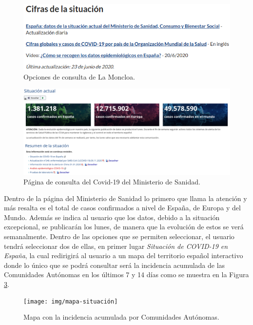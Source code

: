 \begin{figure}[H]
	\centering
	\includegraphics[width=1\textwidth]{img/opciones-moncloa}
	\caption{Opciones de consulta de La Moncloa.}
	\label{fig:opciones-moncloa}
\end{figure}

\begin{figure}[H]
	\centering
	\includegraphics[width=1\textwidth]{img/ministerio-salud}
	\caption{Página de consulta del Covid-19 del Ministerio de Sanidad.}
	\label{fig:ministerio-salud}
\end{figure}

Dentro de la página del Ministerio de Sanidad lo primero que llama la atención y más resalta es el total de casos confirmados a nivel de España, de Europa y del Mundo. Además se indica al usuario que los datos, debido a la situación excepcional, se publicarán los lunes, de manera que la evolución de estos se verá semanalmente. Dentro de las opciones que se permiten seleccionar, el usuario tendrá seleccionar dos de ellas, en primer lugar \textit{Situación de COVID-19 en España}, la cual redirigirá al usuario a un mapa del territorio español interactivo donde lo único que se podrá consultar será la incidencia acumulada de las Comunidades Autónomas en los últimos 7 y 14 días como se muestra en la Figura \ref{fig:mapa-situacion}.

\begin{figure}[H]
	\centering
	\texttt{[image: img/mapa-situación]}
	\caption{Mapa con la incidencia acumulada por Comunidades Autónomas.}
	\label{fig:mapa-situacion}
\end{figure}

